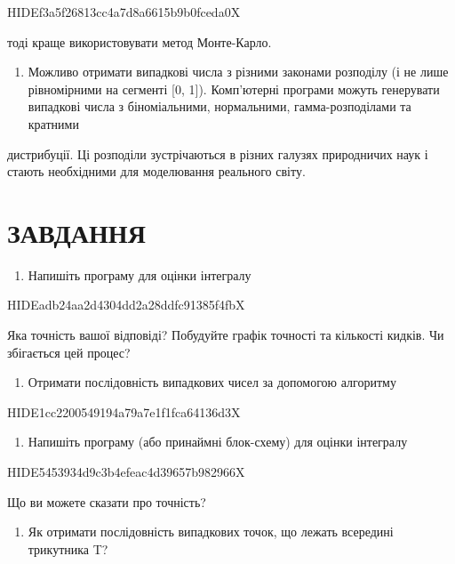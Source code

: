 \documentclass[
  ukrainian,
]{article}
\providecommand{\tightlist}{%
  \setlength{\itemsep}{0pt}\setlength{\parskip}{0pt}}
\begin{document}
HIDEf3a5f26813cc4a7d8a6615b9b0fceda0X

тоді краще використовувати метод Монте-Карло.

\begin{enumerate}
\def\labelenumi{\arabic{enumi}.}
\setcounter{enumi}{2}
\tightlist
\item
  Можливо отримати випадкові числа з різними законами розподілу (і не
  лише рівномірними на сегменті {[}0, 1{]}). Комп'ютерні програми можуть
  генерувати випадкові числа з біноміальними, нормальними,
  гамма-розподілами та кратними
\end{enumerate}

дистрибуції. Ці розподіли зустрічаються в різних галузях природничих
наук і стають необхідними для моделювання реального світу.

\section{ЗАВДАННЯ}\label{ux437ux430ux432ux434ux430ux43dux43dux44f-13}

\begin{enumerate}
\def\labelenumi{\arabic{enumi}.}
\tightlist
\item
  Напишіть програму для оцінки інтегралу
\end{enumerate}

HIDEadb24aa2d4304dd2a28ddfc91385f4fbX

Яка точність вашої відповіді? Побудуйте графік точності та кількості
кидків. Чи збігається цей процес?

\begin{enumerate}
\def\labelenumi{\arabic{enumi}.}
\setcounter{enumi}{1}
\tightlist
\item
  Отримати послідовність випадкових чисел за допомогою алгоритму
\end{enumerate}

HIDE1cc2200549194a79a7e1f1fca64136d3X

\begin{enumerate}
\def\labelenumi{\arabic{enumi}.}
\setcounter{enumi}{2}
\tightlist
\item
  Напишіть програму (або принаймні блок-схему) для оцінки інтегралу
\end{enumerate}

HIDE5453934d9c3b4efeac4d39657b982966X

Що ви можете сказати про точність?

\begin{enumerate}
\def\labelenumi{\arabic{enumi}.}
\setcounter{enumi}{3}
\tightlist
\item
  Як отримати послідовність випадкових точок, що лежать всередині
  трикутника T?
\end{enumerate}
\end{document}

